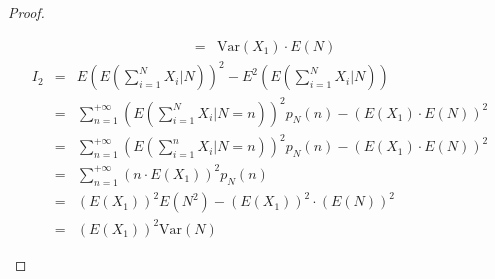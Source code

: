 \begin{proof}
\begin{enumerate}
\begin{eqnarray*}
&=&\text{Var}\left(X_{1}\right) \cdot E(N)
\end{eqnarray*}
\begin{eqnarray*}
I_{2} &=&E\left(E\left(\sum_{i=1}^{N} X_{i}  |  N\right)\right)^{2}-E^{2}\left(E\left(\sum_{i=1}^{N} X_{i}  |  N\right)\right) \\
&=&\sum_{n=1}^{+\infty}\left(E\left(\sum_{i=1}^{N} X_{i}  |  N=n\right)\right)^{2} p_{N}(n)-\left(E\left(X_{1}\right) \cdot E(N)\right)^{2} \\
&=&\sum_{n=1}^{+\infty}\left(E\left(\sum_{i=1}^{n} X_{i}  |  N=n\right)\right)^{2} p_{N}(n)-\left(E\left(X_{1}\right) \cdot E(N)\right)^{2} \\
&=&\sum_{n=1}^{+\infty}\left(n \cdot E\left(X_{1}\right)\right)^{2} p_{N}(n) \\
&=&\left(E\left(X_{1}\right)\right)^{2} E\left(N^{2}\right)-\left(E\left(X_{1}\right)\right)^{2} \cdot(E(N))^{2} \\
&=&\left(E\left(X_{1}\right)\right)^{2} \text{Var}(N)
\end{eqnarray*}
    \end{enumerate}
\end{proof}

